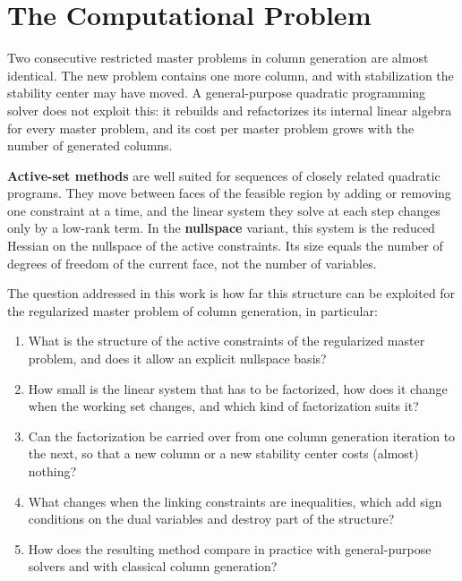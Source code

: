 \newpage


\section{The Computational Problem}

Two consecutive restricted master problems in column generation are almost identical. The
new problem contains one more column, and with stabilization the stability center may have
moved. A general-purpose quadratic programming solver does not exploit this: it rebuilds and
refactorizes its internal linear algebra for every master problem, and its cost per master
problem grows with the number of generated columns.

\bigskip

\textbf{Active-set methods} are well suited for sequences of closely related quadratic
programs. They move between faces of the feasible region by adding or removing one
constraint at a time, and the linear system they solve at each step changes only by a
low-rank term. In the \textbf{nullspace} variant, this system is the reduced Hessian on the
nullspace of the active constraints. Its size equals the number of degrees of freedom of the
current face, not the number of variables.

\bigskip

The question addressed in this work is how far this structure can be exploited for the
regularized master problem of column generation, in particular:
\begin{enumerate}
    \item What is the structure of the active constraints of the regularized master problem,
          and does it allow an explicit nullspace basis?
    \item How small is the linear system that has to be factorized, how does it change
          when the working set changes, and which kind of factorization suits it?
    \item Can the factorization be carried over from one column generation iteration to the
          next, so that a new column or a new stability center costs (almost) nothing?
    \item What changes when the linking constraints are inequalities, which add sign
          conditions on the dual variables and destroy part of the structure?
    \item How does the resulting method compare in practice with general-purpose solvers and
          with classical column generation?
\end{enumerate}



